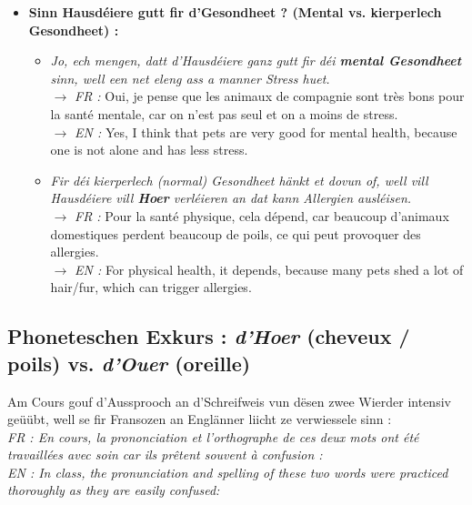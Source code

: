 \begin{itemize}
    \item \textbf{Sinn Hausdéiere gutt fir d'Gesondheet ? (Mental vs. kierperlech Gesondheet) :}
    \begin{itemize}
        \item \textit{Jo, ech mengen, datt d'Hausdéiere ganz gutt fir déi \textbf{mental Gesondheet} sinn, well een net eleng ass a manner Stress huet.} \\
        $\rightarrow$ \textit{FR :} Oui, je pense que les animaux de compagnie sont très bons pour la santé mentale, car on n'est pas seul et on a moins de stress. \\
        $\rightarrow$ \textit{EN :} Yes, I think that pets are very good for mental health, because one is not alone and has less stress.
        \item \textit{Fir déi kierperlech (normal) Gesondheet hänkt et dovun of, well vill Hausdéiere vill \textbf{Hoer} verléieren an dat kann Allergien ausléisen.} \\
        $\rightarrow$ \textit{FR :} Pour la santé physique, cela dépend, car beaucoup d'animaux domestiques perdent beaucoup de poils, ce qui peut provoquer des allergies. \\
        $\rightarrow$ \textit{EN :} For physical health, it depends, because many pets shed a lot of hair/fur, which can trigger allergies.
    \end{itemize}
\end{itemize}

\subsection{Phoneteschen Exkurs : \textit{d'Hoer} (cheveux / poils) vs. \textit{d'Ouer} (oreille)}

Am Cours gouf d'Aussprooch an d'Schreifweis vun dësen zwee Wierder intensiv geüübt, well se fir Fransozen an Englänner liicht ze verwiessele sinn : \\
\textit{FR : En cours, la prononciation et l'orthographe de ces deux mots ont été travaillées avec soin car ils prêtent souvent à confusion :} \\
\textit{EN : In class, the pronunciation and spelling of these two words were practiced thoroughly as they are easily confused:}

